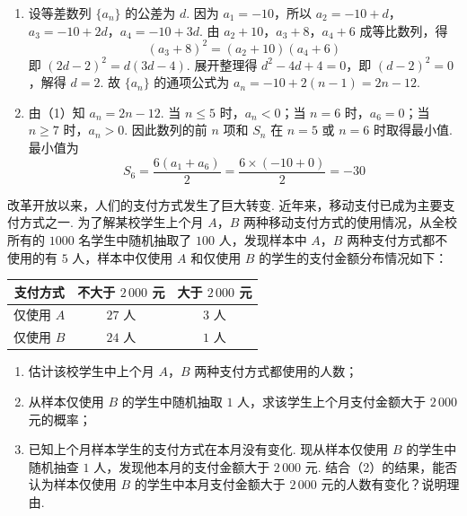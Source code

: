 \begin{solution}
\begin{enumerate}
\item 设等差数列 \(\{a_n\}\) 的公差为 \(d\). 因为 \(a_1=-10\)，所以 \(a_2=-10+d\)，\(a_3=-10+2d\)，\(a_4=-10+3d\).
由 \(a_2+10\)，\(a_3+8\)，\(a_4+6\) 成等比数列，得
\[
(a_3+8)^2=(a_2+10)(a_4+6)
\]
即 \((2d-2)^2=d(3d-4)\). 展开整理得 \(d^2-4d+4=0\)，即 \((d-2)^2=0\)，解得 \(d=2\).
故 \(\{a_n\}\) 的通项公式为 \(a_n=-10+2(n-1)=2n-12\).

\item 由（1）知 \(a_n=2n-12\). 当 \(n\le5\) 时，\(a_n<0\)；当 \(n=6\) 时，\(a_6=0\)；当 \(n\ge7\) 时，\(a_n>0\).
因此数列的前 \(n\) 项和 \(S_n\) 在 \(n=5\) 或 \(n=6\) 时取得最小值.
最小值为
\[
S_6=\frac{6(a_1+a_6)}{2}=\frac{6\times(-10+0)}{2}=-30
\]
\end{enumerate}
\end{solution}

\begin{problem}
改革开放以来，人们的支付方式发生了巨大转变. 近年来，移动支付已成为主要支付方式之一. 为了解某校学生上个月 \(A\)，\(B\) 两种移动支付方式的使用情况，从全校所有的 \(1000\) 名学生中随机抽取了 \(100\) 人，发现样本中 \(A\)，\(B\) 两种支付方式都不使用的有 \(5\) 人，样本中仅使用 \(A\) 和仅使用 \(B\) 的学生的支付金额分布情况如下：

\begin{center}
\begin{tabular}{|c|c|c|}
\hline
支付方式 & 不大于 \(2\,000\) 元 & 大于 \(2\,000\) 元 \\
\hline
仅使用 \(A\) & \(27\) 人 & \(3\) 人 \\
\hline
仅使用 \(B\) & \(24\) 人 & \(1\) 人 \\
\hline
\end{tabular}
\end{center}

\begin{enumerate}
\item 估计该校学生中上个月 \(A\)，\(B\) 两种支付方式都使用的人数；

\item 从样本仅使用 \(B\) 的学生中随机抽取 \(1\) 人，求该学生上个月支付金额大于 \(2\,000\) 元的概率；

\item 已知上个月样本学生的支付方式在本月没有变化. 现从样本仅使用 \(B\) 的学生中随机抽查 \(1\) 人，发现他本月的支付金额大于 \(2\,000\) 元. 结合（2）的结果，能否认为样本仅使用 \(B\) 的学生中本月支付金额大于 \(2\,000\) 元的人数有变化？说明理由.
\end{enumerate}
\end{problem}

